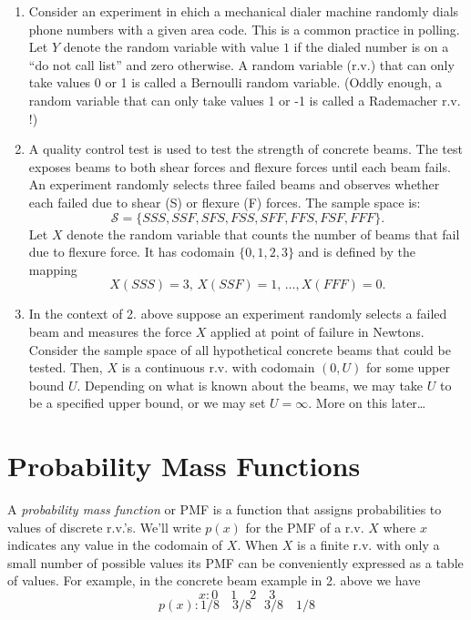 \documentclass[
]{book}
\begin{document}
\begin{enumerate}
\def\labelenumi{\arabic{enumi}.}
\item
  Consider an experiment in ehich a mechanical dialer machine randomly dials phone numbers with a given area code. This is a common practice in polling. Let \(Y\) denote the random variable with value \(1\) if the dialed number is on a ``do not call list'' and zero otherwise. A random variable (r.v.) that can only take values 0 or 1 is called a Bernoulli random variable. (Oddly enough, a random variable that can only take values 1 or -1 is called a Rademacher r.v. !)
\item
  A quality control test is used to test the strength of concrete beams. The test exposes beams to both shear forces and flexure forces until each beam fails. An experiment randomly selects three failed beams and observes whether each failed due to shear (S) or flexure (F) forces. The sample space is:
  \[\mathcal{S} = \{SSS, SSF, SFS, FSS, SFF, FFS, FSF, FFF\}.\]
  Let \(X\) denote the random variable that counts the number of beams that fail due to flexure force. It has codomain \(\{0,1,2,3\}\) and is defined by the mapping
  \[X(SSS) = 3, \, X(SSF) = 1, \, \ldots, X(FFF) = 0.\]
\item
  In the context of 2. above suppose an experiment randomly selects a failed beam and measures the force \(X\) applied at point of failure in Newtons. Consider the sample space of all hypothetical concrete beams that could be tested. Then, \(X\) is a continuous r.v. with codomain \((0,U)\) for some upper bound \(U\). Depending on what is known about the beams, we may take \(U\) to be a specified upper bound, or we may set \(U = \infty\). More on this later\ldots{}
\end{enumerate}

\hypertarget{probability-mass-functions}{%
\section{Probability Mass Functions}\label{probability-mass-functions}}

A \emph{probability mass function} or PMF is a function that assigns probabilities to values of discrete r.v.'s. We'll write \(p(x)\) for the PMF of a r.v. \(X\) where \(x\) indicates any value in the codomain of \(X\). When \(X\) is a finite r.v. with only a small number of possible values its PMF can be conveniently expressed as a table of values. For example, in the concrete beam example in 2. above we have
\[x: 0 \quad 1\quad 2\quad 3\]
\[p(x):1/8\quad 3/8\quad 3/8 \quad 1/8\]
\end{document}
